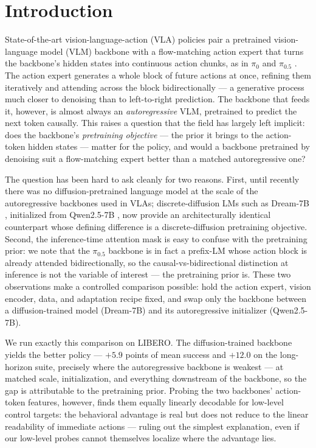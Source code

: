 \documentclass[conference]{IEEEtran}
\begin{document}
\section{Introduction}
State-of-the-art vision-language-action (VLA) policies pair a pretrained
vision-language model (VLM) backbone with a flow-matching action expert that turns
the backbone's hidden states into continuous action chunks, as in $\pi_0$ and
$\pi_{0.5}$ \cite{pi0,pi05,openpi}. The action expert generates a whole block of
future actions at once, refining them iteratively and attending across the block
bidirectionally --- a generative process much closer to denoising than to
left-to-right prediction. The backbone that feeds it, however, is almost always an
\emph{autoregressive} VLM, pretrained to predict the next token causally. This
raises a question that the field has largely left implicit: does the backbone's
\emph{pretraining objective} --- the prior it brings to the action-token hidden
states --- matter for the policy, and would a backbone pretrained by denoising
suit a flow-matching expert better than a matched autoregressive one?

The question has been hard to ask cleanly for two reasons. First, until recently
there was no diffusion-pretrained language model at the scale of the autoregressive
backbones used in VLAs; discrete-diffusion LMs such as Dream-7B
\cite{dream}, initialized from Qwen2.5-7B \cite{qwen25}, now provide an
architecturally identical counterpart whose defining difference is a
discrete-diffusion pretraining objective. Second, the inference-time attention mask is easy to confuse with the
pretraining prior: we note that the $\pi_{0.5}$ backbone is in fact a prefix-LM
whose action block is already attended bidirectionally, so the causal-vs-bidirectional
distinction at inference is not the variable of interest --- the pretraining prior
is. These two observations make a controlled comparison possible: hold the action
expert, vision encoder, data, and adaptation recipe fixed, and swap only the
backbone between a diffusion-trained model (Dream-7B) and its autoregressive
initializer (Qwen2.5-7B).

We run exactly this comparison on LIBERO. The diffusion-trained backbone yields
the better policy --- $+5.9$ points of mean success and $+12.0$ on the
long-horizon suite, precisely where the autoregressive backbone is weakest --- at
matched scale, initialization, and everything downstream of the backbone, so the
gap is attributable to the pretraining prior. Probing the two backbones'
action-token features, however, finds them equally linearly decodable for
low-level control targets: the behavioral advantage is real but does not reduce to
the linear readability of immediate actions --- ruling out the simplest
explanation, even if our low-level probes cannot themselves localize where the
advantage lies.
\end{document}

